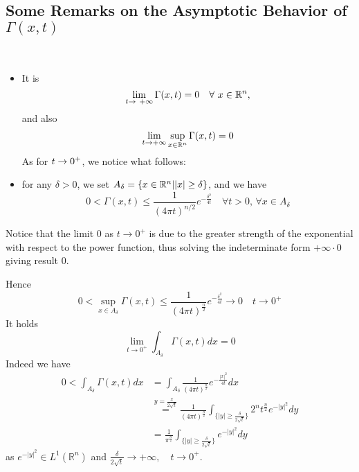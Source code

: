 \subsection{Some Remarks on the Asymptotic Behavior of $\Gamma (x,t)$ }\\
\begin{itemize}
    \item It is 
  \[
  \lim_{t \to\ +\infty} \Gamma (x,t) = 0 \quad \forall \ x \in \mathbb{R}^n, 
  \]
  and also 
  \begin{equation*}
      \lim_{t \to +\infty}\sup_{x \in \mathbb{R}^n}\Gamma (x,t) = 0 
  \end{equation*}
  As for $t\rightarrow 0^+$, we notice what follows:    
  \item for any $\delta>0$, we set $A_\delta= \{x \in \mathbb{R}^n| |x| \geq \delta \}$, and we have 
  \begin{equation*}
      0 < \Gamma(x,t)\leq \frac{1}{(4 \pi t )^{n/2}} e ^{-\frac{\delta^2}{4t}} \quad \forall t >0, \, \forall x \in A_\delta
  \end{equation*}
\end{itemize}
\begin{remark}
    Notice that the limit $0$ as $t \rightarrow 0^+$ is due to the greater strength of the exponential with respect to the power function, thus solving the indeterminate form $+\infty \cdot 0$ giving result $0$. \\
\end{remark}
Hence 
\begin{equation*}
    0 < \sup_{x \in A_\delta} \Gamma(x,t) \leq \frac{1}{(4\pi t)^\frac{n}{2}} e^{-\frac{\delta^2}{4t}} \rightarrow 0 \quad t \rightarrow 0^+
\end{equation*}
It holds 
\begin{equation*}
    \lim_{t \rightarrow 0^+} \int_{A_\delta} \Gamma(x,t) dx = 0
\end{equation*}
Indeed we have 
\begin{align*}
    0 < \int_{A_\delta} \Gamma(x,t) dx &= \int_{A_\delta} \frac{1}{(4 \pi t)^\frac{n}{2}} e^{- \frac{|x|^2}{4t}} dx \\
    &\stackrel{y = \frac{x}{2 \sqrt{t}}}= \frac{1}{(4 \pi t)^\frac{n}{2}} \int_{\{|y| \geq \frac{\delta}{2 \sqrt{t}}\}} 2^n t^\frac{n}{2}e^{-|y|^2} dy\\
    &= \frac{1}{\pi ^\frac{n}{2}}\int_{\{|y| \geq \frac{\delta}{2 \sqrt{t}}\}} e^{-|y|^2} dy 
\end{align*}
as $e^{-|y|^2} \in L^1(\mathbb{R}^n)$ and $\frac{\delta}{2 \sqrt{t}} \rightarrow +\infty, \quad t \rightarrow 0^+$.\\
